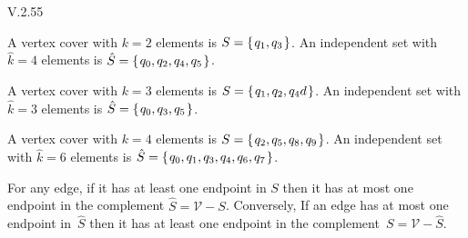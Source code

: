 \begin{ans}{V.2.55}
\begin{exparts}
\item A vertex cover with $k=2$ elements is $S=\set{q_1,q_3}$.
An independent set with $\hat{k}=4$ elements is
$\hat{S}=\set{q_0,q_2,q_4,q_5}$.
\item A vertex cover with $k=3$ elements is $S=\set{q_1,q_2,q_4d}$.
An independent set with $\hat{k}=3$ elements is
$\hat{S}=\set{q_0,q_3,q_5}$.
\item A vertex cover with $k=4$ elements is $S=\set{q_2,q_5,q_8,q_9}$.
An independent set with $\hat{k}=6$ elements is
  $\hat{S}=\set{q_0,q_1,q_3,q_4,q_6,q_7}$.
\item For any edge, if it has at least one endpoint in
$S$ then it has at most one endpoint in the complement $\hat{S}=\mathcal{V}-S$.
Conversely, If an edge has at most one endpoint in~$\hat{S}$
then it has at least one endpoint in the complement~$S=\mathcal{V}-\hat{S}$.
\end{exparts}
\end{ans}
%
